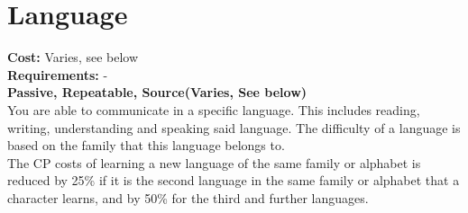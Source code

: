 \section{Language}\label{sec:language}
\textbf{Cost:} Varies, see below\\
\textbf{Requirements:} -\\
\textbf{Passive, Repeatable, Source(Varies, See below)}\\
You are able to communicate in a specific language. This includes reading, writing, understanding and speaking said language. The difficulty of a language is based on the family that this language belongs to.\\
The CP costs of learning a new language of the same family or alphabet is reduced by 25\% if it is the second language in the same family or alphabet that a character learns, and by 50\% for the third and further languages.\\
\\

